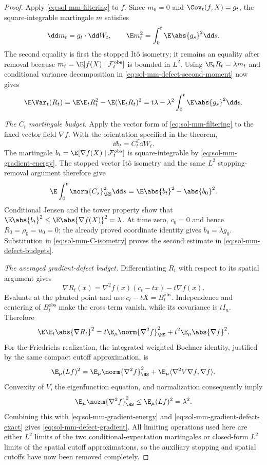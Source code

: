 \documentclass[../main.tex]{subfiles}
\begin{document}
\begin{proof}
Apply \eqref{eq:sol-mm-filtering} to $f$.  Since $m_0=0$ and
$\Cov_t(f,X)=g_t$, the square-integrable martingale $m$ satisfies
\[
  \dd m_t=g_t\cdot\dd W_t,
  \qquad
  \E m_t^2=\int_0^t\E\abs{g_s}^2\dd s.
\]
The second equality is first the stopped It\^o isometry; it remains an equality after removal
because $m_t=\E[f(X)\mid\mathcal F_t^{\mathrm{obs}}]$ is bounded in $L^2$.
Using $\E_tR_t=\lambda m_t$ and conditional variance decomposition in
\eqref{eq:sol-mm-defect-second-moment} now gives
\[
  \E\Var_t(R_t)
  =\E\E_tR_t^2-\E(\E_tR_t)^2
  =t\lambda-\lambda^2\int_0^t\E\abs{g_s}^2\dd s.
\]

\medskip
\noindent\emph{The $C_t$ martingale budget.}
Apply the vector form of \eqref{eq:sol-mm-filtering} to the fixed vector field $\nabla f$.
With the orientation specified in the theorem,
\[
  \dd b_t=C_t^T\dd W_t.
\]
The martingale $b_t=\E[\nabla f(X)\mid\mathcal F_t^{\mathrm{obs}}]$ is square-integrable by
\eqref{eq:sol-mm-gradient-energy}.  The stopped vector It\^o isometry and the same $L^2$
stopping-removal argument therefore give
\begin{equation}
  \E\int_0^t\norm{C_s}_{\HS}^2\dd s
  =\E\abs{b_t}^2-\abs{b_0}^2.
  \label{eq:sol-mm-C-isometry}
\end{equation}
Conditional Jensen and the tower property show that
$\E\abs{b_t}^2\le\E\abs{\nabla f(X)}^2=\lambda$.  At time zero,
$c_0=0$ and hence $R_0=\rho_0=u_0=0$; the already proved coordinate identity gives
$b_0=\lambda g_0$.  Substitution in \eqref{eq:sol-mm-C-isometry} proves the second estimate in
\eqref{eq:sol-mm-defect-budgets}.

\medskip
\noindent\emph{The averaged gradient-defect budget.}
Differentiating $R_t$ with respect to its spatial argument gives
\begin{equation}
  \nabla R_t(x)=\nabla^2f(x)(c_t-tx)-t\nabla f(x).
  \label{eq:sol-mm-gradient-defect-formula}
\end{equation}
Evaluate at the planted point and use $c_t-tX=B_t^{\mathrm{obs}}$.  Independence and centering
of $B_t^{\mathrm{obs}}$ make the cross term vanish, while its covariance is $tI_n$.  Therefore
\begin{equation}
  \E\E_t\abs{\nabla R_t}^2
  =t\E_\mu\norm{\nabla^2f}_{\HS}^2+t^2\E_\mu\abs{\nabla f}^2.
  \label{eq:sol-mm-gradient-defect-exact}
\end{equation}
For the Friedrichs realization, the integrated weighted Bochner identity, justified by the same
compact cutoff approximation, is
\[
  \E_\mu(Lf)^2
  =\E_\mu\norm{\nabla^2f}_{\HS}^2
   +\E_\mu\langle\nabla^2V\nabla f,\nabla f\rangle.
\]
Convexity of $V$, the eigenfunction equation, and normalization consequently imply
\[
  \E_\mu\norm{\nabla^2f}_{\HS}^2
  \le\E_\mu(Lf)^2=\lambda^2.
\]
Combining this with \eqref{eq:sol-mm-gradient-energy} and
\eqref{eq:sol-mm-gradient-defect-exact} gives \eqref{eq:sol-mm-defect-gradient}.
All limiting operations used here are either $L^2$ limits of the two conditional-expectation
martingales or closed-form $L^2$ limits of the spatial cutoff approximations, so the auxiliary
stopping and spatial cutoffs have now been removed completely.
\end{proof}
\end{document}
